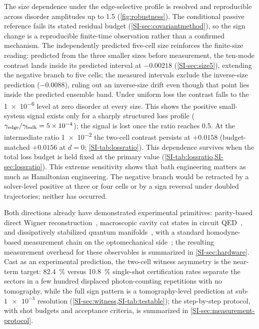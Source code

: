 \documentclass[aps,pra,preprint,superscriptaddress,amsmath,amssymb]{revtex4-2}
\begin{document}
The size dependence under the edge-selective profile is resolved and reproducible across disorder amplitudes up to \num{1.5} (\cref{fig:robustness}). The conditional passive reference fails its stated residual budget (\cref{SI-sec:covariantmethod}), so the sign change is a reproducible finite-time observation rather than a confirmed mechanism. The independently predicted five-cell size reinforces the finite-size reading: predicted from the three smaller sizes before measurement, the ten-mode contrast lands inside its predicted interval at $-\num{0.00218}$ (\cref{SI-sec:size5}), extending the negative branch to five cells; the measured intervals exclude the inverse-size prediction ($-\num{0.0088}$), ruling out an inverse-size drift even though that point lies inside the predicted ensemble band. Under uniform loss the contrast falls to the \num{1e-6} level at zero disorder at every size. This shows the positive small-system signal exists only for a sharply structured loss profile ($\gamma_{\rm edge}/\gamma_{\rm bulk}=\num{5e-4}$); the signal is lost once the ratio reaches \num{0.5}. At the intermediate ratio \num{1e-2} the two-cell contrast persists at $+\num{0.0158}$ (budget-matched $+\num{0.0156}$ at $d=\num{0}$; \cref{SI-tab:lossratio}). This dependence survives when the total loss budget is held fixed at the primary value (\cref{SI-tab:lossratio,SI-sec:lossratio}). This extreme sensitivity shows that bath engineering matters as much as Hamiltonian engineering. The negative branch would be retracted by a solver-level positive at three or four cells or by a sign reversal under doubled trajectories; neither has occurred.

Both directions already have demonstrated experimental primitives: parity-based direct Wigner reconstruction~\cite{Lutterbach1997}, macroscopic cavity cat states in circuit QED~\cite{Vlastakis2013}, and dissipatively stabilized quantum manifolds~\cite{Touzard2018}, with a standard homodyne-based measurement chain on the optomechanical side~\cite{Aspelmeyer2014}; the resulting measurement overhead for these observables is summarized in \cref{SI-sec:hardware}. Cast as an experimental prediction, the two-cell witness asymmetry is the near-term target: \qty{82.4}{\percent} versus \qty{10.8}{\percent} single-shot certification rates separate the sectors in a few hundred displaced photon-counting repetitions with no tomography, while the full sign pattern is a tomography-level prediction at sub-$\num{1e-3}$ resolution (\cref{SI-sec:witness,SI-tab:testable}); the step-by-step protocol, with shot budgets and acceptance criteria, is summarized in \cref{SI-sec:measurement-protocol}.
\end{document}
